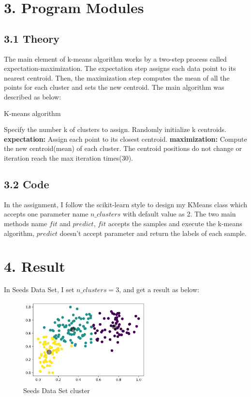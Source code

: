 \documentclass{article}
\begin{document}
	\section{3. Program Modules}

		\subsection{3.1 Theory}
			The main element of k-means algorithm works by a two-step process called expectation-maximization.
			The expectation step assigns each data point to its nearest centroid.
			Then, the maximization step computes the mean of all the points for each cluster and sets the new centroid.
			The main algorithm was described as below:

			\begin{algorithm}
				\caption{K-means algorithm}
				\hspace*{0.02in}
				\begin{algorithmic}[1]
					\State Specify the number k of clusters to assign.
					\State Randomly initialize k centroids.
					\Repeat
						\State \textbf{expectation: } Assign each point to its closest centroid.
						\State \textbf{maximization: } Compute the new centroid(mean) of each cluster.
					\Until The centroid positions do not change or iteration reach the max iteration times(30).
				\end{algorithmic}
			\end{algorithm}
		
		\subsection{3.2 Code}
			In the assignment, I follow the scikit-learn style to design my KMeans class which accepts one parameter name $n\_clusters$ with
			default value as 2. The two main methods name $fit$ and $predict$, $fit$ accepts the samples and execute the k-means algorithm, 
			$predict$ doesn't accept parameter and return the labels of each sample.

	\section{4. Result}
		In Seeds Data Set, I set $n\_clusters=3$, and get a result as below:
			\begin{figure}[H]
				\centering
				\includegraphics[width=0.6\textwidth]{1.png}
				\caption{Seeds Data Set cluster}
				\label{Fig.main5}
			\end{figure}
\end{document}
